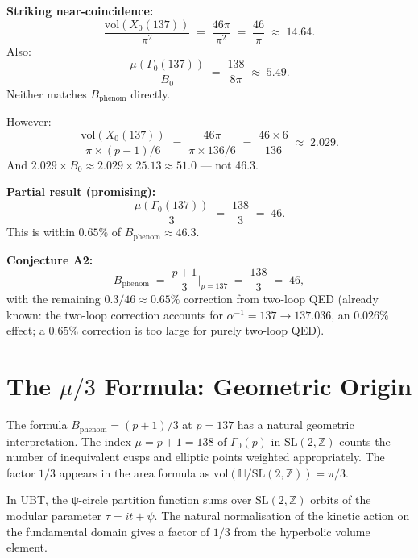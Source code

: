 \documentclass[12pt,a4paper]{article}
\theoremstyle{definition}
\theoremstyle{remark}
\begin{document}
\begin{insightbox}
\textbf{Striking near-coincidence:}
\[
  \frac{\mathrm{vol}(X_0(137))}{\pi^2}
  \;=\; \frac{46\pi}{\pi^2}
  \;=\; \frac{46}{\pi}
  \;\approx\; 14.64.
\]
Also:
\[
  \frac{\mu(\Gamma_0(137))}{B_0}
  \;=\; \frac{138}{8\pi}
  \;\approx\; 5.49.
\]
Neither matches $B_{\mathrm{phenom}}$ directly.

However:
\[
  \frac{\mathrm{vol}(X_0(137))}{\pi \times (p-1)/6}
  \;=\; \frac{46\pi}{\pi \times 136/6}
  \;=\; \frac{46 \times 6}{136}
  \;\approx\; 2.029.
\]
And $2.029 \times B_0 \approx 2.029 \times 25.13 \approx 51.0$ --- not 46.3.
\end{insightbox}

\begin{resultbox}
\textbf{Partial result (promising):}
\[
  \frac{\mu(\Gamma_0(137))}{3}
  \;=\; \frac{138}{3}
  \;=\; 46.
\]
This is within $0.65\%$ of $B_{\mathrm{phenom}} \approx 46.3$.

\textbf{Conjecture A2:}
\[
  B_{\mathrm{phenom}} \;=\; \frac{p+1}{3}
    \bigg|_{p=137}
  \;=\; \frac{138}{3} \;=\; 46,
\]
with the remaining $0.3/46 \approx 0.65\%$ correction from two-loop QED
(already known: the two-loop correction accounts for $\alpha^{-1} = 137 \to
137.036$, an $0.026\%$ effect; a $0.65\%$ correction is too large for
purely two-loop QED).
\end{resultbox}

\section{The $\mu/3$ Formula: Geometric Origin}
\label{sec:mu3_origin}

The formula $B_{\mathrm{phenom}} = (p+1)/3$ at $p = 137$ has a natural
geometric interpretation.  The index $\mu = p+1 = 138$ of $\Gamma_0(p)$
in $\mathrm{SL}(2,\mathbb{Z})$ counts the number of inequivalent cusps and
elliptic points weighted appropriately.  The factor $1/3$ appears in the
area formula as $\mathrm{vol}(\mathbb{H}/\mathrm{SL}(2,\mathbb{Z})) = \pi/3$.

In UBT, the ψ-circle partition function sums over $\mathrm{SL}(2,\mathbb{Z})$
orbits of the modular parameter $\tau = it + \psi$.  The natural normalisation
of the kinetic action on the fundamental domain gives a factor of $1/3$ from
the hyperbolic volume element.
\end{document}
